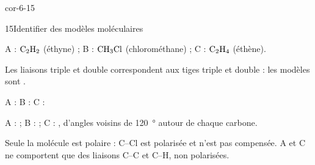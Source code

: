 \begin{blocLivre}{cor-6-15}
\begin{corrige}{15}{Identifier des modèles moléculaires}
\begin{questions}
\item A : $\ce{C2H2}$ (éthyne) ; B : $\ce{CH3Cl}$ (chlorométhane) ; C : $\ce{C2H4}$ (éthène).
\item Les liaisons triple et double correspondent aux tiges triple et double : les modèles sont .
\par\smallskip A : \qquad B : \qquad
C : 
\item A :  ; B :  ; C : , d'angles voisins de \qty{120}{\degree} autour de chaque carbone.
\item Seule la molécule  est polaire : C--Cl est polarisée et n'est pas compensée. A et C ne comportent que des
liaisons C--C et C--H, non polarisées.
\end{questions}
\end{corrige}
\end{blocLivre}
